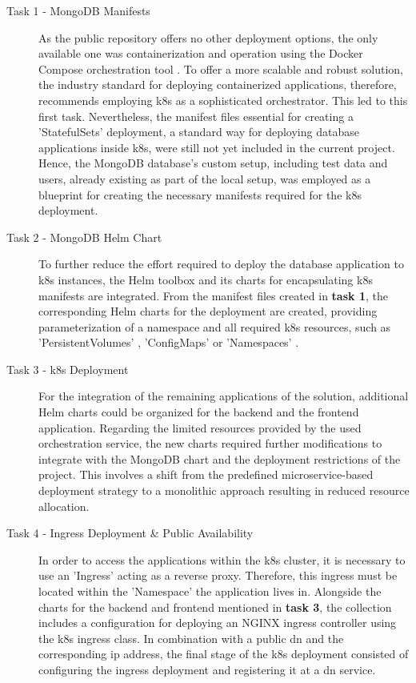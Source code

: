 \begin{description}
    \item[Task 1 - MongoDB Manifests] As the public repository offers no other deployment options, the only available one was containerization and operation using the Docker Compose orchestration tool \cite{noauthor_overview_2023}. 
    To offer a more scalable and robust solution, the industry standard for deploying containerized applications, therefore, recommends employing \acrshort{k8s} \cite{noauthor_produktionsreife_nodate} as a sophisticated orchestrator. This led to this first task. 
    Nevertheless, the manifest files essential for creating a 'StatefulSets' \cite{noauthor_statefulsets_nodate} deployment, a standard way for deploying database applications inside \acrshort{k8s}, were still not yet included in the current project. 
    Hence, the MongoDB \cite{noauthor_mongodb_nodate} database's custom setup, including test data and users, already existing as part of the local setup, was employed as a blueprint for creating the necessary manifests required for the \acrshort{k8s} deployment.
    \item[Task 2 - MongoDB Helm Chart] To further reduce the effort required to deploy the database application to \acrshort{k8s} instances, the Helm \cite{noauthor_helm_nodate} toolbox and its charts for encapsulating \acrshort{k8s} manifests are integrated.  
    From the manifest files created in \textbf{task 1}, the corresponding Helm charts for the deployment are created, providing parameterization of a namespace and all required \acrshort{k8s} resources, such as 'PersistentVolumes' \cite{noauthor_persistent_nodate}, 'ConfigMaps' \cite{noauthor_configmaps_nodate} or 'Namespaces' \cite{noauthor_namespaces_nodate}. 
    \item[Task 3 - \acrshort{k8s} Deployment] For the integration of the remaining applications of the solution, additional Helm charts could be organized for the backend and the frontend application. 
    Regarding the limited resources provided by the used orchestration service, the new charts required further modifications to integrate with the MongoDB chart and the deployment restrictions of the project. This involves a shift from the predefined microservice-based deployment strategy to a monolithic approach resulting in reduced resource allocation.
    \item[Task 4 - Ingress Deployment \& Public Availability] In order to access the applications within the \acrshort{k8s} cluster, it is necessary to use an 'Ingress' \cite{noauthor_ingress_nodate} acting as a reverse proxy. 
    Therefore, this ingress must be located within the 'Namespace' the application lives in.
    Alongside the charts for the backend and frontend mentioned in \textbf{task 3}, the collection includes a configuration for deploying an NGINX ingress controller \cite{noauthor_nginx_nodate} using the \acrshort{k8s} ingress class. 
    In combination with a public \acrshort{dn} and the corresponding \acrshort{ip} address, the final stage of the \acrshort{k8s} deployment consisted of configuring the ingress deployment and registering it at a \acrshort{dn} service.
\end{description}

